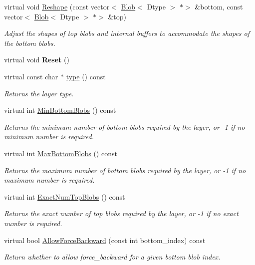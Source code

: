 \begin{DoxyCompactItemize}
virtual void \mbox{\hyperlink{classcaffe_1_1_recurrent_layer_aea7d9f8a75896b5bff438c6cdc966b6b}{Reshape}} (const vector$<$ \mbox{\hyperlink{classcaffe_1_1_blob}{Blob}}$<$ Dtype $>$ $\ast$$>$ \&bottom, const vector$<$ \mbox{\hyperlink{classcaffe_1_1_blob}{Blob}}$<$ Dtype $>$ $\ast$$>$ \&top)
\begin{DoxyCompactList}\small\item\em Adjust the shapes of top blobs and internal buffers to accommodate the shapes of the bottom blobs. \end{DoxyCompactList}\item 
\mbox{\label{classcaffe_1_1_recurrent_layer_a7ba1993aeddd6b0a13b875381945aee9}} 
virtual void {\bfseries Reset} ()
\item 
\mbox{\label{classcaffe_1_1_recurrent_layer_afc0b925b8bf94a795c9ff84f411e70a3}} 
virtual const char $\ast$ \mbox{\hyperlink{classcaffe_1_1_recurrent_layer_afc0b925b8bf94a795c9ff84f411e70a3}{type}} () const
\begin{DoxyCompactList}\small\item\em Returns the layer type. \end{DoxyCompactList}\item 
virtual int \mbox{\hyperlink{classcaffe_1_1_recurrent_layer_ac31b705bc02d333ae768f7c2184fbfae}{Min\+Bottom\+Blobs}} () const
\begin{DoxyCompactList}\small\item\em Returns the minimum number of bottom blobs required by the layer, or -\/1 if no minimum number is required. \end{DoxyCompactList}\item 
virtual int \mbox{\hyperlink{classcaffe_1_1_recurrent_layer_a983e1ead91884f9d2049a3000254961c}{Max\+Bottom\+Blobs}} () const
\begin{DoxyCompactList}\small\item\em Returns the maximum number of bottom blobs required by the layer, or -\/1 if no maximum number is required. \end{DoxyCompactList}\item 
virtual int \mbox{\hyperlink{classcaffe_1_1_recurrent_layer_a4cb9032f0942c0fef5f6c7094c7b2ab8}{Exact\+Num\+Top\+Blobs}} () const
\begin{DoxyCompactList}\small\item\em Returns the exact number of top blobs required by the layer, or -\/1 if no exact number is required. \end{DoxyCompactList}\item 
virtual bool \mbox{\hyperlink{classcaffe_1_1_recurrent_layer_a8d91610cc8b9615a1db4f07fe5590a37}{Allow\+Force\+Backward}} (const int bottom\+\_\+index) const
\begin{DoxyCompactList}\small\item\em Return whether to allow force\+\_\+backward for a given bottom blob index. \end{DoxyCompactList}\end{DoxyCompactItemize}

